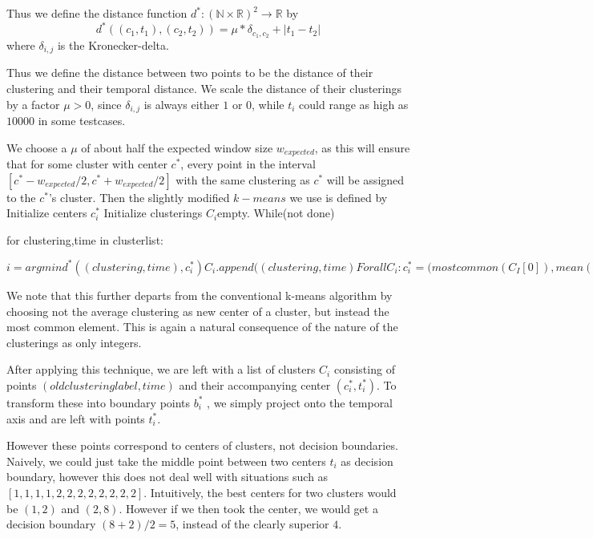 Thus we define the distance function $d^*:(\mathbb{N}\times \mathbb{R})^2\rightarrow \mathbb{R}$  by
\[
d^* ((c_1,t_1),(c_2,t_2))=\mu *\delta_{c_1,c_2} +|t_1-t_2|
\]
where $\delta_{i,j}$ is the Kronecker-delta. 

Thus we define the distance between two points to be the distance of their clustering and their temporal distance. We scale the distance of their clusterings by a factor $\mu > 0$, since $\delta_{i,j}$ is always either $1$ or $0$, while $t_i$ could range as high as $10000$ in some testcases. 

We choose a $\mu$ of about half the expected window size $w_{expected}$, as this will ensure that for some cluster with center $c^*$, every point in the interval $[c^*-w_{expected}/2,c^*+w_{expected}/2]$ with the same clustering as $c^*$ will be assigned to the $c^*$'s cluster. 
Then the slightly modified $k-means$ we use is defined by
Initialize centers $c^*_i$
Initialize clusterings $C_i$empty.
While(not done)
{
for clustering,time in clusterlist:

$
{
i=argmin d^*((clustering,time),c^*_i)
C_i.append((clustering,time)
}
For all C_i:
c^*_i=(mostcommon(C_I[0]),mean(C_i[1])
repeat till happy$
}
We note that this further departs from the conventional k-means algorithm by choosing not the average clustering as new center of a cluster, but instead the most common element. This is again a natural consequence of the nature of the clusterings as only integers.

After applying this technique, we are left with a list of clusters $C_i$ consisting of points $(old clustering label,time)$  and their accompanying center $(c^*_i,t^*_i)$. To transform these into boundary points $b^*_i$ , we simply project onto the temporal axis and are left with points $t^*_i$.

However these points correspond to centers of clusters, not decision boundaries. Naively, we could just take the middle point between two centers $t_i$ as decision boundary, however this does not deal well with situations such as $[1,1,1,1,2,2,2,2,2,2,2,2]$. Intuitively, the best centers for two clusters would be $(1,2)$ and $(2,8)$. However if we then took the center, we would get a decision boundary $(8+2)/2=5$, instead of the clearly superior $4$.

